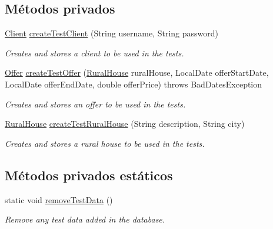 \subsection*{Métodos privados}
\begin{DoxyCompactItemize}
\item 
\mbox{\hyperlink{classcom_1_1ruralhousejsf_1_1domain_1_1_client}{Client}} \mbox{\hyperlink{classcom_1_1ruralhousejsf_1_1_hibernate_data_access_test_a971c94d6c41317c2cc8de024153f0dc9}{create\+Test\+Client}} (String username, String password)
\begin{DoxyCompactList}\small\item\em Creates and stores a client to be used in the tests. \end{DoxyCompactList}\item 
\mbox{\hyperlink{classcom_1_1ruralhousejsf_1_1domain_1_1_offer}{Offer}} \mbox{\hyperlink{classcom_1_1ruralhousejsf_1_1_hibernate_data_access_test_adb47ff6c8ba0fc7e7327407a8c937c4a}{create\+Test\+Offer}} (\mbox{\hyperlink{classcom_1_1ruralhousejsf_1_1domain_1_1_rural_house}{Rural\+House}} rural\+House, Local\+Date offer\+Start\+Date, Local\+Date offer\+End\+Date, double offer\+Price)  throws Bad\+Dates\+Exception 
\begin{DoxyCompactList}\small\item\em Creates and stores an offer to be used in the tests. \end{DoxyCompactList}\item 
\mbox{\hyperlink{classcom_1_1ruralhousejsf_1_1domain_1_1_rural_house}{Rural\+House}} \mbox{\hyperlink{classcom_1_1ruralhousejsf_1_1_hibernate_data_access_test_a455296993315fc3b33f1c5806622ad32}{create\+Test\+Rural\+House}} (String description, String city)
\begin{DoxyCompactList}\small\item\em Creates and stores a rural house to be used in the tests. \end{DoxyCompactList}\end{DoxyCompactItemize}
\subsection*{Métodos privados estáticos}
\begin{DoxyCompactItemize}
\item 
static void \mbox{\hyperlink{classcom_1_1ruralhousejsf_1_1_hibernate_data_access_test_a71fef61bb66234d92d84ddd795de842a}{remove\+Test\+Data}} ()
\begin{DoxyCompactList}\small\item\em Remove any test data added in the database. \end{DoxyCompactList}\end{DoxyCompactItemize}


